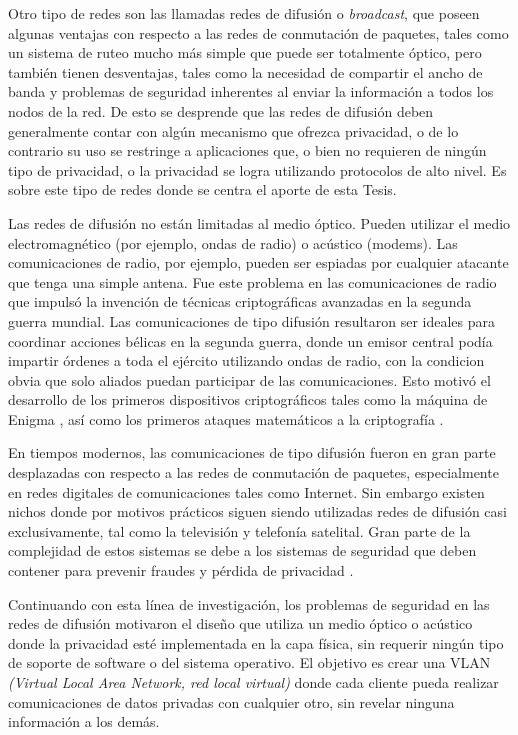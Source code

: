 Otro tipo de redes son las llamadas redes de difusión o \textit{broadcast}, que poseen algunas ventajas con respecto a las redes de conmutación de paquetes, tales como un sistema de ruteo mucho más simple que puede ser totalmente óptico, pero también tienen desventajas, tales como la necesidad de compartir el ancho de banda y problemas de seguridad inherentes al enviar la información a todos los nodos de la red. De esto se desprende que las redes de difusión deben generalmente contar con algún mecanismo que ofrezca privacidad, o de lo contrario su uso se restringe a aplicaciones que, o bien no requieren de ningún tipo de privacidad, o la privacidad se logra utilizando protocolos de alto nivel. Es sobre este tipo de redes donde se centra el aporte de esta Tesis.

Las redes de difusión no están limitadas al medio óptico. Pueden utilizar el medio electromagnético (por ejemplo, ondas de radio) o acústico (modems). Las comunicaciones de radio, por ejemplo, pueden ser espiadas por cualquier atacante que tenga una simple antena. Fue este problema en las comunicaciones de radio que impulsó la invención de técnicas criptográficas avanzadas en la segunda guerra mundial. Las comunicaciones de tipo difusión resultaron ser ideales para coordinar acciones bélicas en la segunda guerra, donde un emisor central podía impartir órdenes a toda el ejército utilizando ondas de radio, con la condicion obvia que solo aliados puedan participar de las comunicaciones. Esto motivó el desarrollo de los primeros dispositivos criptográficos tales como la máquina de Enigma \cite{kozaczuk1984enigma}, así como los primeros ataques matemáticos a la criptografía \cite{welchman1982hut}.

En tiempos modernos, las comunicaciones de tipo difusión fueron en gran parte desplazadas con respecto a las redes de conmutación de paquetes, especialmente en redes digitales de comunicaciones tales como Internet. Sin embargo existen nichos donde por motivos prácticos siguen siendo utilizadas redes de difusión casi exclusivamente, tal como la televisión y telefonía satelital. Gran parte de la complejidad de estos sistemas se debe a los sistemas de seguridad que deben contener para prevenir fraudes y pérdida de privacidad \cite{hanas1981addressable}.

Continuando con esta línea de investigación, los problemas de seguridad en las redes de difusión motivaron el diseño que utiliza un medio óptico o acústico donde la privacidad esté implementada en la capa física, sin requerir ningún tipo de soporte de software o del sistema operativo. El objetivo es crear una VLAN \textit{(Virtual Local Area Network, red local virtual)} donde cada cliente pueda realizar comunicaciones de datos privadas con cualquier otro, sin revelar ninguna información a los demás.

